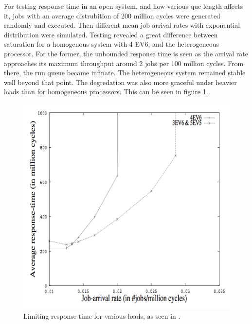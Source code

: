 For testing response time in an open system, and how various que length affects it, jobs with an average distrubition of 200 million cycles were generated randomly and executed.
Then different mean job arrival rates with exponential distribution were simulated.
Testing revealed a great difference between saturation for a homogenous system with 4 EV6, and the heterogeneous processor.
For the former, the unbounded response time is seen as the arrival rate approaches its maximum throughput around 2 jobs per 100 million cycles.
From there, the run queue became infinate.
The heterogeneous system remained stable well beyond that point.
The degredation was also more graceful under heavier loads than for homogeneous processors.
This can be seen in figure \ref{fig:Kumar3}.

\begin{figure}[htb]
    \centering
    \includegraphics[width=1.0\textwidth]{Figures/Heterogeneous/Kumar3}
    \caption{Limiting response-time for various loads, as seen in \cite{heterogeneous-perf}.}
    \label{fig:Kumar3}
\end{figure}


